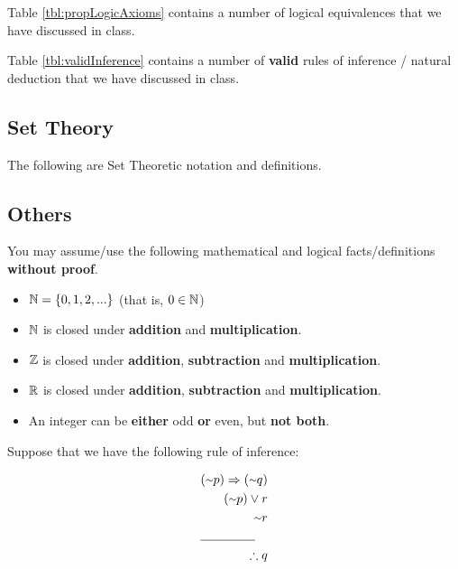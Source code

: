 \documentclass[letterpaper,12pt]{article}
\begin{document}
{\large Table \ref{tbl:propLogicAxioms} contains a number of logical equivalences that we have discussed in class.


Table \ref{tbl:validInference} contains a number of {\bf valid} rules of inference / natural deduction that we have discussed in class.



\subsection*{Set Theory}
\label{subsec:setTheory}

{\large The following are Set Theoretic notation and definitions.

 }

\subsection*{Others}
\label{subsec:otherAssumptions}

{\large You may assume/use the following mathematical and  logical facts/definitions {\bf without proof}. 

 \begin{itemize}
       \item $\mathbb{N} = \{0,1,2,...\}$ (that is, $0 \in \mathbb{N}$)
		\item $\mathbb{N}$ is closed under \textbf{addition} and \textbf{multiplication}.
		\item $\mathbb{Z}$ is closed under \textbf{addition}, \textbf{subtraction} and 
		\textbf{multiplication}.
		\item $\mathbb{R}$ is closed under \textbf{addition}, \textbf{subtraction} and 
			\textbf{multiplication}.
		\item An integer can be \textbf{either} odd \textbf{or} even, but \textbf{not both}.
\end{itemize}
}
\pagebreak


{\large Suppose that we have the following rule of inference: }

{\large 
\begin{align*} 
		(\neg  p) \Rightarrow (\neg  q) \\ 
		(\neg  p) \lor r \\ 
		\neg  r \\
		\cline{1-2}
		\therefore q
\end{align*} 
}
			
}
\end{document}
